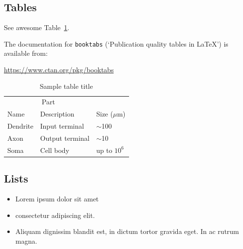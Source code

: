 \documentclass{article}
\begin{document}
\subsection{Tables}
See awesome Table~\ref{tab:table}.

The documentation for \verb+booktabs+ (`Publication quality tables in LaTeX') is available from:
\begin{center}
	\url{https://www.ctan.org/pkg/booktabs}
\end{center}


\begin{table}
	\caption{Sample table title}
	\centering
	\begin{tabular}{lll}
		\toprule
		\multicolumn{2}{c}{Part}                   \\
		\cmidrule(r){1-2}
		Name     & Description     & Size ($\mu$m) \\
		\midrule
		Dendrite & Input terminal  & $\sim$100     \\
		Axon     & Output terminal & $\sim$10      \\
		Soma     & Cell body       & up to $10^6$  \\
		\bottomrule
	\end{tabular}
	\label{tab:table}
\end{table}

\subsection{Lists}
\begin{itemize}
	\item Lorem ipsum dolor sit amet
	\item consectetur adipiscing elit.
	\item Aliquam dignissim blandit est, in dictum tortor gravida eget. In ac rutrum magna.
\end{itemize}




\end{document}
